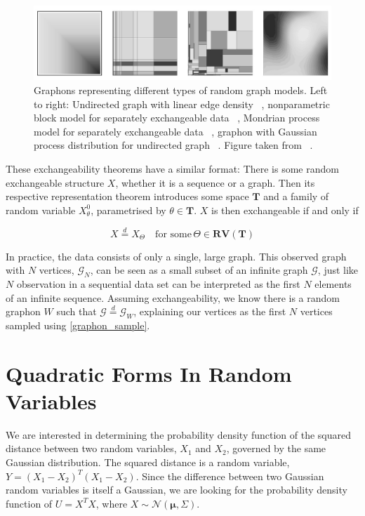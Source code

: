 \documentclass[12pt]{report}
\newcommand{\bs}{\boldsymbol}
\newcommand{\mc}[1]{\mathcal{#1}}
\renewcommand{\bs}{\boldsymbol}
\begin{document}
\begin{figure}[!ht]
    \centering
    \includegraphics[width = 1\textwidth]{graphons.jpg}
    \caption{Graphons representing different types of random graph models. Left to right: Undirected  graph  with  linear  edge  density ~\parencite{graphlim}, nonparametric block model for separately exchangeable data ~\parencite{infrelmodel}, Mondrian process model for separately exchangeable  data ~\parencite{mondrian}, graphon  with  Gaussian  process  distribution  for  undirected  graph ~\parencite{graphongp}. Figure taken from ~\parencite{exchangeableorbanz}.}
\end{figure}

These exchangeability theorems have a similar format: There is some random exchangeable structure $X$, whether it is a sequence or a graph. Then its respective representation theorem introduces some space $\bs{T}$ and a family of random variable $X_\theta^0$, parametrised by $\theta \in \bs{T}$. $X$ is then exchangeable if and only if

\begin{equation}
    X \overset{d}{=} X_\Theta\quad \text{for some}\, \Theta \in \bs{RV}(\bs{T})
\end{equation}

In practice, the data consists of only a single, large graph. This observed graph with $N$ vertices, $\mc{G}_N$, can be seen as a small subset of an infinite graph $\mc{G}$, just like $N$ observation in a sequential data set can be interpreted as the first $N$ elements of an infinite sequence. Assuming exchangeability, we know there is a random graphon $W$ such that $\mc{G} \overset{d}{=} \mc{G}_W$, explaining our vertices as the first $N$ vertices sampled using \ref{graphon_sample}.

\section{Quadratic Forms In Random Variables} \label{sec:quad}
We are interested in determining the probability density function of the squared distance between two random variables, $X_1$ and $X_2$, governed by the same Gaussian distribution. The squared distance is a random variable, $Y = (X_1 - X_2)^T(X_1 - X_2)$. Since the difference between two Gaussian random variables is itself a Gaussian, we are looking for the probability density function of $U = X^TX$, where $X \sim \mc{N}(\bs{\mu}, \Sigma)$. \\
\end{document}
